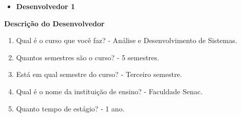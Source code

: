 \begin{apendicesenv}
\begin{comment}
\begin{enumerate}
\setcounter{enumi}{25}
\item Como você testa as suas aplicações?\newline
- Resposta 1
\item Você costuma testar todas as páginas de aplicação que desenvolve?\newline
- Resposta 2
\item Você costuma armazenar os resultados dos testes que realiza?\newline
- Resposta 3
\item Você costuma a elaborar casos de testes para sua aplicação?\newline
- Resposta 4
\item Seria bom testes automatizados de interface para sua aplicação (selenium)?\newline
- Resposta 5
\end{enumerate}

\textbf{Implantação}

\begin{enumerate}
\setcounter{enumi}{30}
\item Você costuma migrar as definições dos objetos de banco (tabelas, sequences, views e
etc) junto com a aplicação?\newline
- Resposta 1
\item Você costuma verificar se os apelidos da aplicação de desenvolvimento e produção
estão iguais?\newline
- Resposta 2
\item Realiza uma navegação por todas as páginas da aplicação?\newline
- Resposta 3
\item Verifica se todas as tabelas foram criadas?\newline
- Resposta 4
\end{enumerate}
\end{comment}


\begin{itemize}
	\item \textbf{Desenvolvedor 1}
\end{itemize}

\textbf{Descrição do Desenvolvedor}

\begin{enumerate}
	\item Qual é o curso que você faz?\newline
	- Análise e Desenvolvimento de Sistemas.
	\item Quantos semestres são o curso?\newline
	- 5 semestres.
	\item Está em qual semestre do curso?\newline
	- Terceiro semestre.
	\item Qual é o nome da instituição de ensino?\newline
	- Faculdade Senac.
	\item Quanto tempo de estágio?\newline
	- 1 ano.
\end{enumerate}


\end{apendicesenv}
